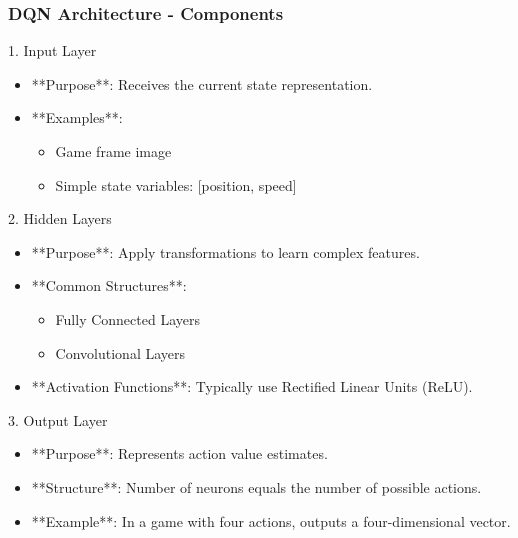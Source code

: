 \documentclass[aspectratio=169]{beamer}
\begin{document}
\begin{frame}[fragile]
    \frametitle{DQN Architecture - Components}
    \begin{block}{1. Input Layer}
        \begin{itemize}
            \item **Purpose**: Receives the current state representation.
            \item **Examples**: 
            \begin{itemize}
                \item Game frame image
                \item Simple state variables: [position, speed]
            \end{itemize}
        \end{itemize}
    \end{block}

    \begin{block}{2. Hidden Layers}
        \begin{itemize}
            \item **Purpose**: Apply transformations to learn complex features.
            \item **Common Structures**: 
            \begin{itemize}
                \item Fully Connected Layers
                \item Convolutional Layers
            \end{itemize}
            \item **Activation Functions**: Typically use Rectified Linear Units (ReLU).
        \end{itemize}
    \end{block}

    \begin{block}{3. Output Layer}
        \begin{itemize}
            \item **Purpose**: Represents action value estimates.
            \item **Structure**: Number of neurons equals the number of possible actions.
            \item **Example**: In a game with four actions, outputs a four-dimensional vector.
        \end{itemize}
    \end{block}
\end{frame}
\end{document}
